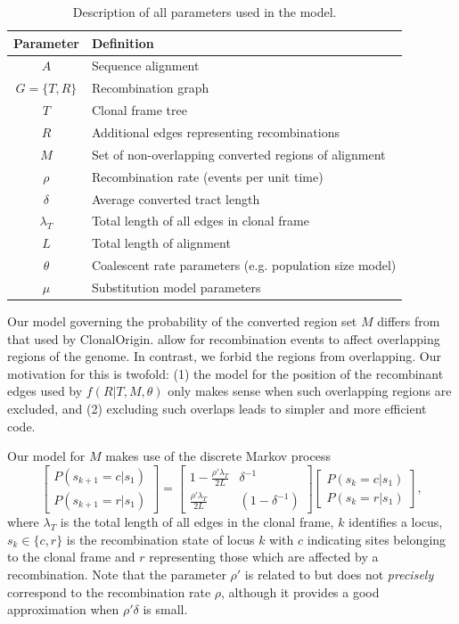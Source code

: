 \documentclass[a4paper,10pt]{article}
\begin{document}
\begin{table}[t]
\begin{tabular}{|cl|}
  \hline
  Parameter & Definition \\
  \hline
  $A$ & Sequence alignment \\
  $G=\{T,R\}$ & Recombination graph \\
  $T$ & Clonal frame tree \\
  $R$ & Additional edges representing recombinations \\
  $M$ & Set of non-overlapping converted regions of alignment \\
  $\rho$ & Recombination rate (events per unit time) \\
  $\delta$ & Average converted tract length \\
  $\lambda_T$ & Total length of all edges in clonal frame \\
  $L$ & Total length of alignment \\
  $\theta$ & Coalescent rate parameters (e.g. population size model) \\
  $\mu$ & Substitution model parameters \\
  \hline
\end{tabular}
\caption{Description of all parameters used in the model.}
\end{table}


Our model governing the probability of the converted region set $M$
differs from that used by ClonalOrigin. \cite{Didelot2010} allow for
recombination events to affect overlapping regions of the genome.  In
contrast, we forbid the regions from overlapping. Our motivation for
this is twofold: (1) the model for the position of the recombinant edges used
by $f(R|T,M,\theta)$ only makes sense when such overlapping regions
are excluded, and (2) excluding such overlaps leads to simpler and
more efficient code.

Our model for $M$ makes use of the discrete Markov process
\begin{equation}
\begin{bmatrix}
P(s_{k+1}=c|s_1) \\
P(s_{k+1}=r|s_1)
\end{bmatrix}
=
\begin{bmatrix}
1-\frac{\rho' \lambda_T}{2L} & \delta^{-1} \\
\frac{\rho' \lambda_T}{2L} & (1-\delta^{-1})
\end{bmatrix}
\begin{bmatrix}
P(s_{k}=c|s_1) \\
P(s_{k}=r|s_1)
\end{bmatrix},
\end{equation}
where $\lambda_T$ is the total length of all edges in the clonal
frame, $k$ identifies a locus, $s_k\in\{c,r\}$ is the recombination
state of locus $k$ with $c$ indicating sites belonging to the clonal
frame and $r$ representing those which are affected by a
recombination.  Note that the parameter $\rho'$ is related to but does
not \emph{precisely} correspond to the recombination rate $\rho$,
although it provides a good approximation when $\rho'\delta$ is small.
\end{document}
